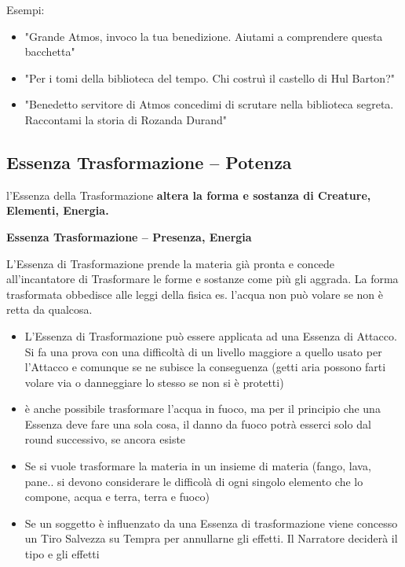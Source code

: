 \documentclass[a4paper,11pt,twoside,openany]{book}
\begin{document}
\bigskip

Esempi:
\begin{itemize}
\item 
"Grande Atmos, invoco la tua benedizione. Aiutami a comprendere questa bacchetta"
\item 
"Per i tomi della biblioteca del tempo. Chi costruì il castello di Hul Barton?"
\item 
"Benedetto servitore di Atmos concedimi di scrutare nella biblioteca segreta. Raccontami la storia di Rozanda Durand"
\end{itemize}
\pagebreak


\subsection{Essenza Trasformazione -- Potenza}

\label{essenza-trasformazione---potenza}

l'Essenza della Trasformazione \textbf{altera la forma e sostanza di Creature, Elementi, Energia.}

\bigskip

\textbf{Essenza Trasformazione -- Presenza, Energia}

L'Essenza di Trasformazione prende la materia già pronta e concede all'incantatore di Trasformare le forme e sostanze come più gli aggrada. La forma trasformata obbedisce alle leggi della fisica es. l'acqua non può volare se non è retta da qualcosa.

\begin{itemize}
\item 
L'Essenza di Trasformazione può essere applicata ad una Essenza di Attacco. Si fa una prova con una difficoltà di un livello maggiore a quello usato per l'Attacco e comunque se ne subisce la conseguenza (getti aria possono farti volare via o danneggiare lo stesso se non si è protetti) 
\item 
è anche possibile trasformare l'acqua in fuoco, ma per il principio che una Essenza deve fare una sola cosa, il danno da fuoco potrà esserci solo dal round successivo, se ancora esiste 
\item 
Se si vuole trasformare la materia in un insieme di materia (fango, lava, pane.. si devono considerare le difficolà di ogni singolo elemento che lo compone, acqua e terra, terra e fuoco) 
\item 
Se un soggetto è influenzato da una Essenza di trasformazione viene concesso un Tiro Salvezza su Tempra per annullarne gli effetti. Il Narratore deciderà il tipo e gli effetti 
\end{itemize}
\end{document}
